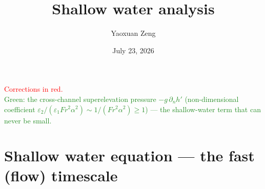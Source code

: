 \documentclass[11pt]{article}
\title{Shallow water analysis}
\author{Yaoxuan Zeng}
\date{July 23, 2026}
\newcommand{\R}[1]{\textcolor{red}{#1}}
\newcommand{\G}[1]{\textcolor{ForestGreen}{#1}}
\begin{document}
\maketitle

\begin{center}
\R{\small Corrections in red.}\\
\G{\small Green: the cross-channel superelevation pressure $-g\,\partial_n h'$
(non-dimensional coefficient $\varepsilon_2/(\varepsilon_1Fr^2\alpha^2)\sim
1/(Fr^2\alpha^2)\ge1$) --- the shallow-water term that can never be small.}
\end{center}

\section{Shallow water equation --- the fast (flow) timescale}
\end{document}
